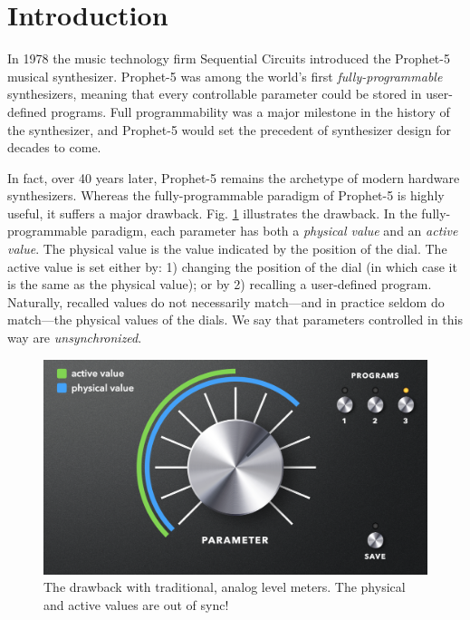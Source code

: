 \documentclass[conference]{IEEEtran}
\begin{document}
\section{Introduction}

In 1978 the music technology firm Sequential Circuits introduced the Prophet-5 musical synthesizer. Prophet-5 was among the world’s first \textit{fully-programmable} synthesizers, meaning that every controllable parameter could be stored in user-defined programs. Full programmability was a major milestone in the history of the synthesizer, and Prophet-5 would set the precedent of synthesizer design for decades to come.

In fact, over 40 years later, Prophet-5 remains the archetype of modern hardware synthesizers. Whereas the fully-programmable paradigm of Prophet-5 is highly useful, it suffers a major drawback. Fig. \ref{fig:param_analog} illustrates the drawback. In the fully-programmable paradigm, each parameter has both a \textit{physical value} and an \textit{active value}. The physical value is the value indicated by the position of the dial. The active value is set either by: 1) changing the position of the dial (in which case it is the same as the physical value); or by 2) recalling a user-defined program. Naturally, recalled values do not necessarily match—and in practice seldom do match—the physical values of the dials. We say that parameters controlled in this way are \textit{unsynchronized}.

\begin{figure}[bhtp]
    \centering
    \includegraphics[width=\columnwidth]{./resources/figures/param_analog.png}
    \caption{The drawback with traditional, analog level meters. The physical and active values are out of sync!}
    \label{fig:param_analog}
\end{figure}
\end{document}
